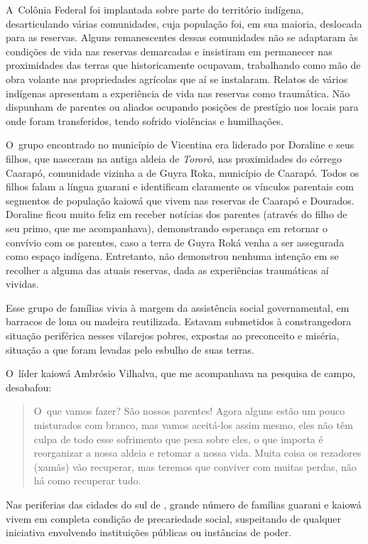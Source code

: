 A~Colônia Federal foi implantada sobre parte do território indígena,
desarticulando várias comunidades, cuja população foi, em sua maioria,
deslocada para as reservas. Alguns remanescentes dessas comunidades não
se adaptaram às condições de vida nas reservas demarcadas e insistiram
em permanecer nas proximidades das terras que historicamente ocupavam,
trabalhando como mão de obra volante nas propriedades agrícolas que aí
se instalaram. Relatos de vários indígenas apresentam a experiência de
vida nas reservas como traumática. Não dispunham de parentes ou aliados
ocupando posições de prestígio nos locais para onde foram transferidos,
tendo sofrido violências e humilhações.

O~grupo encontrado no município de Vicentina era liderado por Doraline e
seus filhos, que nasceram na antiga aldeia de \emph{Tororô}, nas proximidades
do córrego Caarapó, comunidade vizinha a de Guyra Roka, município de
Caarapó. Todos os filhos falam a língua guarani e identificam
claramente os vínculos parentais com segmentos de população kaiowá que
vivem nas reservas de Caarapó e Dourados. Doraline ficou muito feliz em
receber notícias dos parentes (através do filho de seu primo, que me
acompanhava), demonstrando esperança em retornar o convívio com os
parentes, caso a terra de Guyra Roká venha a ser assegurada como espaço
indígena. Entretanto, não demonstrou nenhuma intenção em se recolher a
alguma das atuais reservas, dada as experiências traumáticas aí
vividas.

Esse grupo de famílias vivia à margem da assistência social
governamental, em barracos de lona ou madeira reutilizada. Estavam
submetidos à constrangedora situação periférica nesses vilarejos
pobres, expostas ao preconceito e miséria, situação a que foram levadas
pelo esbulho de suas terras.

O~líder kaiowá Ambrósio Vilhalva, que me acompanhava na pesquisa de
campo, desabafou:

\begin{quote}
O~que vamos fazer? São nossos parentes! Agora alguns estão um pouco
misturados com branco, mas vamos aceitá-los assim mesmo, eles não têm
culpa de todo esse sofrimento que pesa sobre eles, o que importa é
reorganizar a nossa aldeia e retomar a nossa vida. Muita coisa os
rezadores (xamãs) vão recuperar, mas teremos que conviver com muitas
perdas, não há como recuperar tudo.
\end{quote}

Nas periferias das cidades do sul de , grande número de famílias
guarani e kaiowá vivem em completa condição de precariedade social,
suspeitando de qualquer iniciativa envolvendo instituições públicas ou
instâncias de poder. 

